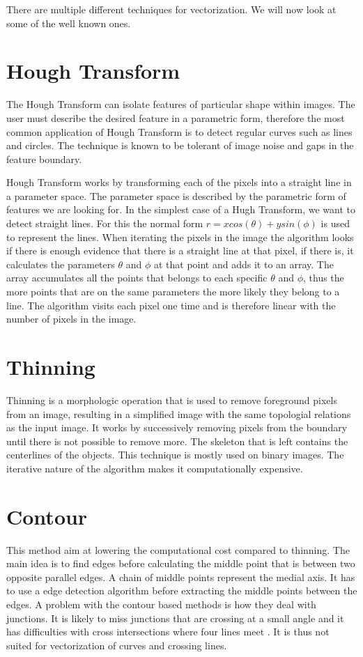There are multiple different techniques for vectorization. We will now look at some of the well known ones.


\section{Hough Transform}
The Hough Transform can isolate features of particular shape within images. The user must describe the desired feature in a parametric form, therefore the most common application of Hough Transform is to detect regular curves such as lines and circles. The technique is known to be tolerant of image noise and gaps in the feature boundary.

Hough Transform works by transforming each of the pixels into a straight line in a parameter space. The parameter space is described by the parametric form of features we are looking for. In the simplest case of a Hugh Transform, we want to detect straight lines. For this the normal form $r = x cos(\theta) + y sin(\phi)$ is used to represent the lines. When iterating the pixels in the image the algorithm looks if there is enough evidence that there is a straight line at that pixel, if there is, it calculates the parameters $\theta$ and $\phi$ at that point and adds it to an array. The array accumulates all the points that belongs to each specific $\theta$ and $\phi$, thus the more points that are on the same parameters the more likely they belong to a line. The algorithm visits each pixel one time and is therefore linear with the number of pixels in the image.

\section{Thinning}
Thinning is a morphologic operation that is used to remove foreground pixels from an image, resulting in a simplified image with the same topologial relations as the input image. It works by successively removing pixels from the boundary until there is not possible to remove more. The skeleton that is left contains the centerlines of the objects. This technique is mostly used on binary images. The iterative nature of the algorithm makes it computationally expensive.

\section{Contour}
This method aim at lowering the computational cost compared to thinning. The main idea is to find edges before calculating the middle point that is between two opposite parallel edges. A chain of middle points represent the medial axis. It has to use a edge detection algorithm before extracting the middle points between the edges. A problem with the contour based methods is how they deal with junctions. It is likely to miss junctions that are crossing at a small angle and it has difficulties with cross intersections where four lines meet \cite{Wenyin1999}. It is thus not suited for vectorization of curves and crossing lines.


